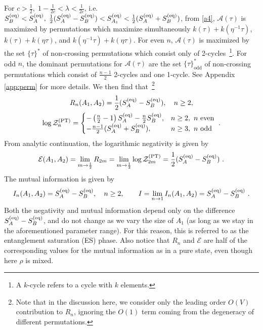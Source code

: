 \documentclass[a4paper,11pt]{article}
\newcommand*{\JKF}[1]{\textcolor{blue}{#1}}
\newcommand\half{{\ensuremath{\frac{1}{2}}}}
\newcommand{\Zpt}{\sZ_n^{(\text{PT})}}
\newcommand{\be}{\begin{equation}}
\newcommand{\ee}{\end{equation}}
\newcommand{\bega}{\begin{gather}}
\newcommand\ov{\over}
\newcommand\ha{{\half}}
\def\le{\left}
\def\ri{\right}
\newcommand\sA{{\ensuremath{{\mathcal A}}}}
\newcommand\sE{{\ensuremath{{\mathcal E}}}}
\newcommand\sZ{{\mathcal Z}}
\begin{document}
\begin{enumerate}
For $c>\ha,\; 1-\frac{1}{2c}< \lambda< \frac{1}{2c}$, i.e.~$S_B^{\rm (eq)} < S_A^{(\rm eq)},\; \ha (S_A^{(\rm eq)} - S_B^{\rm (eq)}) < S_{A_1}^{(\rm eq)} < \ha (S_A^{(\rm eq)} + S_B^{\rm (eq)})$, 
 from \eqref{a4}, $\sA(\tau)$ is maximized by permutations which maximize simultaneously $k(\tau)+ k(\eta^{-1}\tau)$, $k(\tau)+ k(\eta\tau)$, and $k(\eta^{-1}\tau)+ k(\eta\tau)$. For even $n$, 
$\sA(\tau)$ is maximized by the set $\{\tau\}^{\ast}$ of non-crossing permutations which consist only of 2-cycles~\footnote{A $k$-cycle refers to a cycle with $k$ elements.}. For odd $n$, the dominant permutations for $\sA(\tau)$ are the set $\{\tau\}_{\text{odd}}^{\ast}$ of non-crossing permutations which consist of $\frac{n-1}{2}$ 2-cycles and one 1-cycle. See Appendix \ref{app:perm} for more details. We then find that~\footnote{Note that in the discussion here, we consider only the leading order $O(V)$ contribution to $R_n$, ignoring the $O(1)$ term coming from the degeneracy of different permutations.} 
\bega \label{egsm} 
R_n(A_1, A_2) = \ha (S_A^{(\rm eq)} - S_B^{\rm (eq)}) , %
\quad n\geq 2, %
\\
\log \Zpt = \begin{cases} 
- \le({n \ov 2} -1 \ri) S_A^{(\rm eq)} -{n \ov 2} S_B^{\rm (eq)},
& n \geq 2, ~n\text{~even} \\
- \frac{n-1}{2} (S_A^{(\rm eq)} + S_B^{\rm (eq)}) ,%
& n \geq 3, ~n\text{~odd}
\end{cases} \ .
\label{inf_es}
\end{gather} 
From analytic continuation, the logarithmic negativity is given by 
\be 
\sE(A_1, A_2) = \lim_{m\rightarrow \ha} R_{2m} = \lim_{m\rightarrow \ha}\log\sZ_{2m}^{\text{(PT)}} =
\ha (S_A^{(\rm eq)} - S_B^{\rm (eq)}) \ .
\label{neg_inf_es}
\ee
The mutual information is given by 
\be 
I_n(A_1, A_2) = S_A^{(\rm eq)} - S_B^{\rm (eq)},\quad n\geq 2, \quad \quad I = \lim_{n\rightarrow 1} I_n(A_1, A_2) = S_A^{(\rm eq)} - S_B^{\rm (eq)} \ . 
\label{mutual_es}
\ee
Both the negativity and mutual information depend only on the difference $S_A^{(\rm eq)} - S_B^{\rm (eq)}$, and do not change as we vary the size of $A_1$ (as long as we stay in the aforementioned parameter range). For this reason, this is referred to as the entanglement saturation (ES) phase. Also notice that $R_n$ and $\sE$ are half of the corresponding values for the mutual information as in a pure state, even though here $\rho$ is mixed. 



\end{enumerate}
\end{document}
